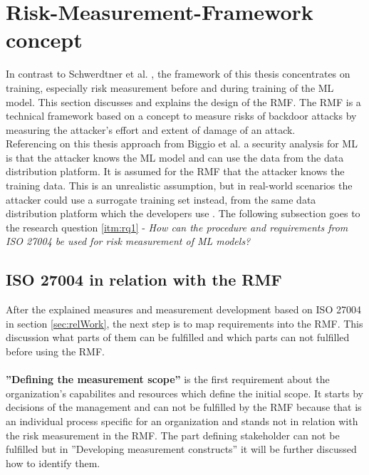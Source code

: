 
\section{Risk-Measurement-Framework concept}
\label{sec:conFrame}

In contrast to Schwerdtner et al. \cite{DBLP:journals/corr/abs-2011-04328}, the framework of this thesis concentrates on training, especially risk measurement before and during training of the ML model. This section discusses and explains the design of the RMF. The RMF is a technical framework based on a concept to measure risks of backdoor attacks \cite{DBLP:conf/eusipco/ArshadAQLY21} by measuring the attacker's effort and extent of damage of an attack. \\ Referencing on this thesis approach from Biggio et al. \cite{DBLP:conf/icml/BiggioNL12} a security analysis for ML is that the attacker knows the ML model and can use the data from the data distribution platform. It is assumed for the RMF that the attacker knows the training data. This is an unrealistic assumption, but in real-world scenarios the attacker could use a surrogate training set instead, from the same data distribution platform which the developers use \cite{DBLP:journals/ml/BarrenoNJT10}. The following subsection goes to the research question \ref{itm:rq1} - \textit{How can the procedure and requirements from ISO 27004 be used for risk measurement of ML models?}

\subsection{ISO 27004 in relation with the RMF}
\label{sec:standard}

After the explained measures and measurement development based on ISO 27004 in section \ref{sec:relWork}, the next step is to map requirements into the RMF. This discussion what parts of them can be fulfilled and which parts can not fulfilled before using the RMF. \\ \\

\textbf{''Defining the measurement scope''} is the first requirement about the organization's capabilites and resources which define the initial scope. It starts by decisions of the management and can not be fulfilled by the RMF because that is an individual process specific for an organization and stands not in relation with the risk measurement in the RMF. The part defining stakeholder can not be fulfilled but in ''Developing measurement constructs'' it will be further discussed how to identify them.  \\ \\

